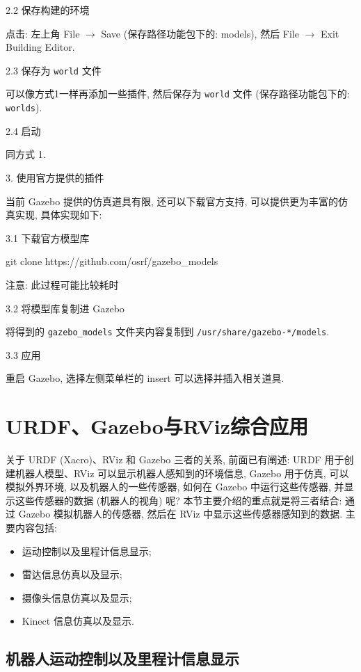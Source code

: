 \documentclass[openany, fontset=windowsold]{ctexbook}
\theoremstyle{kaiti}
\theoremstyle{normal}
\begin{document}
2.2 保存构建的环境

点击: 左上角 File $\rightarrow$ Save (保存路径功能包下的: models), 然后 File $\rightarrow$ Exit Building Editor.

2.3 保存为 \verb|world| 文件

可以像方式1一样再添加一些插件, 然后保存为 \verb|world| 文件 (保存路径功能包下的: \verb|worlds|).

2.4 启动

同方式 1.

3. 使用官方提供的插件

当前 Gazebo 提供的仿真道具有限, 还可以下载官方支持, 可以提供更为丰富的仿真实现, 具体实现如下:

3.1 下载官方模型库

\begin{bash}
  git clone https://github.com/osrf/gazebo_models
\end{bash}

注意: 此过程可能比较耗时

3.2 将模型库复制进 Gazebo

将得到的 \verb|gazebo_models| 文件夹内容复制到 \verb|/usr/share/gazebo-*/models|.

3.3 应用

重启 Gazebo, 选择左侧菜单栏的 insert 可以选择并插入相关道具.

\section{URDF、Gazebo与RViz综合应用}

关于 URDF (Xacro)、RViz 和 Gazebo 三者的关系, 前面已有阐述: URDF 用于创建机器人模型、RViz 可以显示机器人感知到的环境信息, Gazebo 用于仿真, 可以模拟外界环境, 以及机器人的一些传感器, 如何在 Gazebo 中运行这些传感器, 并显示这些传感器的数据 (机器人的视角) 呢? 本节主要介绍的重点就是将三者结合: 通过 Gazebo 模拟机器人的传感器, 然后在 RViz 中显示这些传感器感知到的数据. 主要内容包括:

\begin{itemize}
  \item 运动控制以及里程计信息显示;
  \item 雷达信息仿真以及显示;
  \item 摄像头信息仿真以及显示;
  \item Kinect 信息仿真以及显示.
\end{itemize}

\subsection{机器人运动控制以及里程计信息显示}
\end{document}
